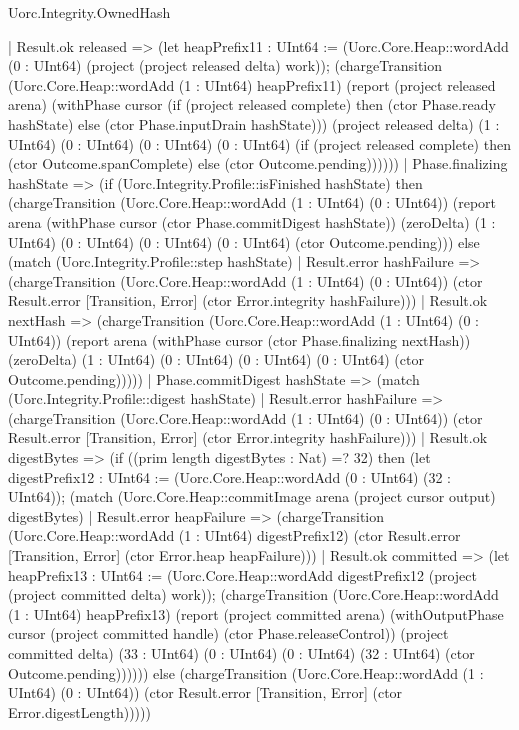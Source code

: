 \begin{lexlean}{Uorc.Integrity.OwnedHash}
\begin{semanticmodule}
{      | Result.ok released => (let heapPrefix11 : UInt64 := (Uorc.Core.Heap::wordAdd (0 : UInt64) (project (project released delta) work)); (chargeTransition (Uorc.Core.Heap::wordAdd (1 : UInt64) heapPrefix11) (report (project released arena) (withPhase cursor (if (project released complete) then (ctor Phase.ready hashState) else (ctor Phase.inputDrain hashState))) (project released delta) (1 : UInt64) (0 : UInt64) (0 : UInt64) (0 : UInt64) (if (project released complete) then (ctor Outcome.spanComplete) else (ctor Outcome.pending))))))
    | Phase.finalizing hashState => (if (Uorc.Integrity.Profile::isFinished hashState) then (chargeTransition (Uorc.Core.Heap::wordAdd (1 : UInt64) (0 : UInt64)) (report arena (withPhase cursor (ctor Phase.commitDigest hashState)) (zeroDelta) (1 : UInt64) (0 : UInt64) (0 : UInt64) (0 : UInt64) (ctor Outcome.pending))) else (match (Uorc.Integrity.Profile::step hashState)
      | Result.error hashFailure => (chargeTransition (Uorc.Core.Heap::wordAdd (1 : UInt64) (0 : UInt64)) (ctor Result.error [Transition, Error] (ctor Error.integrity hashFailure)))
      | Result.ok nextHash => (chargeTransition (Uorc.Core.Heap::wordAdd (1 : UInt64) (0 : UInt64)) (report arena (withPhase cursor (ctor Phase.finalizing nextHash)) (zeroDelta) (1 : UInt64) (0 : UInt64) (0 : UInt64) (0 : UInt64) (ctor Outcome.pending)))))
    | Phase.commitDigest hashState => (match (Uorc.Integrity.Profile::digest hashState)
      | Result.error hashFailure => (chargeTransition (Uorc.Core.Heap::wordAdd (1 : UInt64) (0 : UInt64)) (ctor Result.error [Transition, Error] (ctor Error.integrity hashFailure)))
      | Result.ok digestBytes => (if ((prim length digestBytes : Nat) =? 32) then (let digestPrefix12 : UInt64 := (Uorc.Core.Heap::wordAdd (0 : UInt64) (32 : UInt64)); (match (Uorc.Core.Heap::commitImage arena (project cursor output) digestBytes)
        | Result.error heapFailure => (chargeTransition (Uorc.Core.Heap::wordAdd (1 : UInt64) digestPrefix12) (ctor Result.error [Transition, Error] (ctor Error.heap heapFailure)))
        | Result.ok committed => (let heapPrefix13 : UInt64 := (Uorc.Core.Heap::wordAdd digestPrefix12 (project (project committed delta) work)); (chargeTransition (Uorc.Core.Heap::wordAdd (1 : UInt64) heapPrefix13) (report (project committed arena) (withOutputPhase cursor (project committed handle) (ctor Phase.releaseControl)) (project committed delta) (33 : UInt64) (0 : UInt64) (0 : UInt64) (32 : UInt64) (ctor Outcome.pending)))))) else (chargeTransition (Uorc.Core.Heap::wordAdd (1 : UInt64) (0 : UInt64)) (ctor Result.error [Transition, Error] (ctor Error.digestLength)))))
}
\end{semanticmodule}
\end{lexlean}

